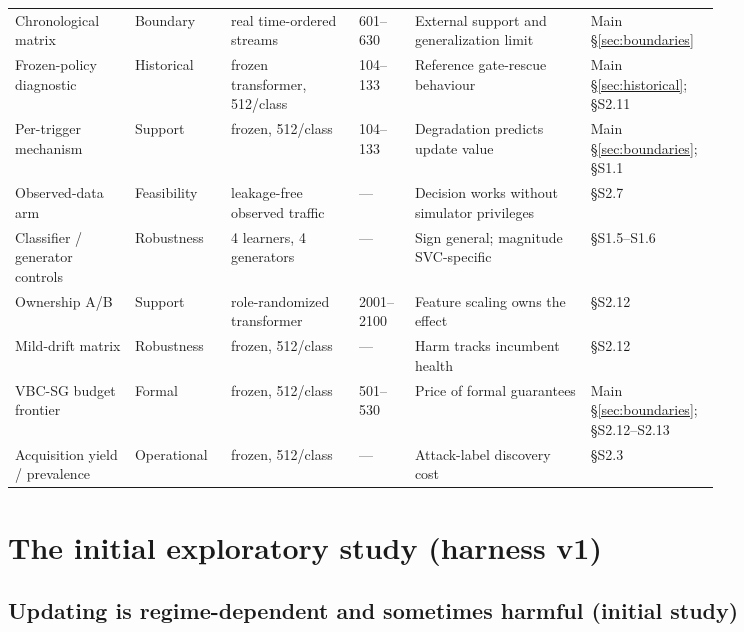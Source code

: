 \documentclass[a4paper,11pt]{article}
\makeatletter
\let\supp@subsection\subsection
\renewcommand{\subsection}{\FloatBarrier\supp@subsection}
\makeatother
\begin{document}
\begin{table}[h]
\begin{tabular}{p{0.155\linewidth} p{0.10\linewidth} p{0.165\linewidth} p{0.075\linewidth} p{0.225\linewidth} p{0.095\linewidth}}
Chronological matrix & Boundary & real time-ordered streams & 601--630 & External support and generalization limit & Main \S\ref{sec:boundaries} \\
Frozen-policy diagnostic & Historical & frozen transformer, 512/class & 104--133 & Reference gate-rescue behaviour & Main \S\ref{sec:historical}; \S S2.11 \\
Per-trigger mechanism & Support & frozen, 512/class & 104--133 & Degradation predicts update value & Main \S\ref{sec:boundaries}; \S S1.1 \\
Observed-data arm & Feasibility & leakage-free observed traffic & --- & Decision works without simulator privileges & \S S2.7 \\
Classifier / generator controls & Robustness & 4 learners, 4 generators & --- & Sign general; magnitude SVC-specific & \S S1.5--S1.6 \\
Ownership A/B & Support & role-randomized transformer & 2001--2100 & Feature scaling owns the effect & \S S2.12 \\
Mild-drift matrix & Robustness & frozen, 512/class & --- & Harm tracks incumbent health & \S S2.12 \\
VBC-SG budget frontier & Formal & frozen, 512/class & 501--530 & Price of formal guarantees & Main \S\ref{sec:boundaries}; \S S2.12--S2.13 \\
Acquisition yield / prevalence & Operational & frozen, 512/class & --- & Attack-label discovery cost & \S S2.3 \\
\bottomrule
\end{tabular}
\end{table}

\setcounter{section}{0}
\section{The initial exploratory study (harness v1)}

\subsection{Updating is regime-dependent and sometimes harmful (initial study)}
\end{document}
